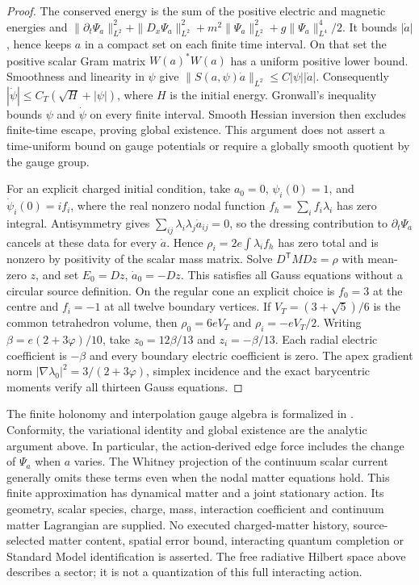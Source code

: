 \begin{proof}
The conserved energy is the sum of the positive electric and magnetic
energies and \(\|\partial_t\Psi_a\|_{L^2}^2+
\|D_x\Psi_a\|_{L^2}^2+m^2\|\Psi_a\|_{L^2}^2+
g\|\Psi_a\|_{L^4}^4/2\). It bounds \(|\dot a|\), hence
keeps \(a\) in a compact set on each finite time interval.
On that set the positive scalar Gram matrix \(W(a)^*W(a)\) has a
uniform positive lower bound. Smoothness and linearity in \(\psi\)
give \(\|S(a,\psi)\dot a\|_{L^2}\leq C|\psi||\dot a|\).
Consequently \(|\dot\psi|\leq C_T(\sqrt H+|\psi|)\), where
\(H\) is the initial energy. Gronwall's inequality bounds \(\psi\)
and \(\dot\psi\) on every finite interval. Smooth Hessian inversion
then excludes finite-time escape, proving global existence. This argument
does not assert a time-uniform bound on gauge potentials or require a
globally smooth quotient by the gauge group.

For an explicit charged initial condition, take \(a_0=0\),
\(\psi_i(0)=1\), and \(\dot\psi_i(0)=if_i\), where the real
nonzero nodal function \(f_h=\sum_i f_i\lambda_i\) has zero
integral. Antisymmetry gives
\(\sum_{ij}\lambda_i\lambda_j\dot a_{ij}=0\), so the
dressing contribution to \(\partial_t\Psi_a\) cancels at these
data for every \(\dot a\). Hence
\(\rho_i=2e\int\lambda_i f_h\) has zero total and is nonzero
by positivity of the scalar mass matrix. Solve
\(D^{\mathsf T}MDz=\rho\) with mean-zero \(z\), and set
\(E_0=Dz\), \(\dot a_0=-Dz\). This satisfies all Gauss equations
without a circular source definition.
On the regular cone an explicit choice is \(f_0=3\) at the centre and
\(f_i=-1\) at all twelve boundary vertices. If
\(V_T=(3+\sqrt5)/6\) is the common tetrahedron volume, then
\(\rho_0=6eV_T\) and \(\rho_i=-eV_T/2\).
Writing \(\beta=e(2+3\varphi)/10\), take
\(z_0=12\beta/13\) and \(z_i=-\beta/13\).
Each radial electric coefficient is \(-\beta\) and every boundary
electric coefficient is zero. The apex gradient norm
\(|\nabla\lambda_0|^2=3/(2+3\varphi)\), simplex incidence and
the exact barycentric moments verify all thirteen Gauss equations.
\end{proof}

The finite holonomy and interpolation gauge algebra is formalized in
. Conformity, the variational
identity and global existence are the analytic argument above. In
particular, the action-derived edge force includes the change of
\(\Psi_a\) when \(a\) varies. The Whitney projection of the continuum
scalar current generally omits these terms even when the nodal matter
equations hold. This finite approximation has dynamical
matter and a joint stationary action. Its geometry, scalar species, charge,
mass, interaction coefficient and continuum matter Lagrangian are supplied.
No executed charged-matter history, source-selected matter content, spatial
error bound, interacting quantum completion or Standard Model identification
is asserted. The free radiative Hilbert space above describes a sector;
it is not a quantization of this full interacting action.
